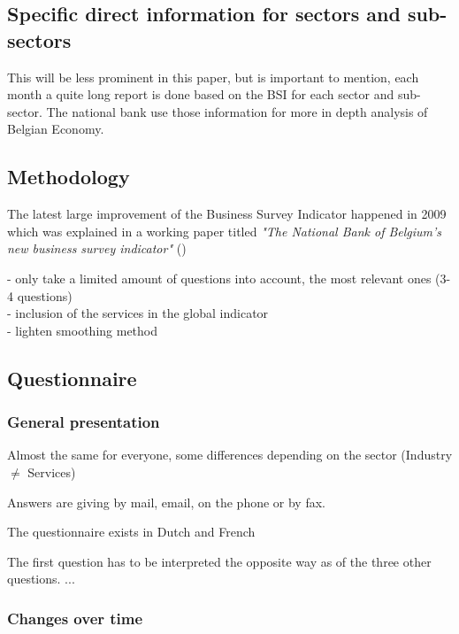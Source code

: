 \documentclass[12pt,a4paper,oneside]{book}
\begin{document}
\subsection{Specific direct information for sectors and sub-sectors}

This will be less prominent in this paper, but is important to mention, each month a quite long report is done based on the BSI for each sector and sub-sector.
The national bank use those information for more in depth analysis of Belgian Economy.

\newpage

\subsection{Methodology}
\label{section:Methodology}

The latest large improvement of the Business Survey Indicator happened in 2009 which was explained in a working paper titled \textit{"The National Bank of Belgium’s new business survey indicator"} 
(\citeauthor{de_greef_national_2009})

- only take a limited amount of questions into account, the most relevant ones (3-4 questions) \\
- inclusion of the services in the global indicator \\
- lighten smoothing method




\subsection{Questionnaire}
\label{sec:Questionnaire}

\subsubsection{General presentation}

Almost the same for everyone, some differences depending on the sector (Industry $\neq$ Services)

Answers are giving by mail, email, on the phone or by fax.

The questionnaire exists in Dutch and French

The first question has to be interpreted the opposite way as of the three other questions. ...


\subsubsection{Changes over time}
\end{document}
